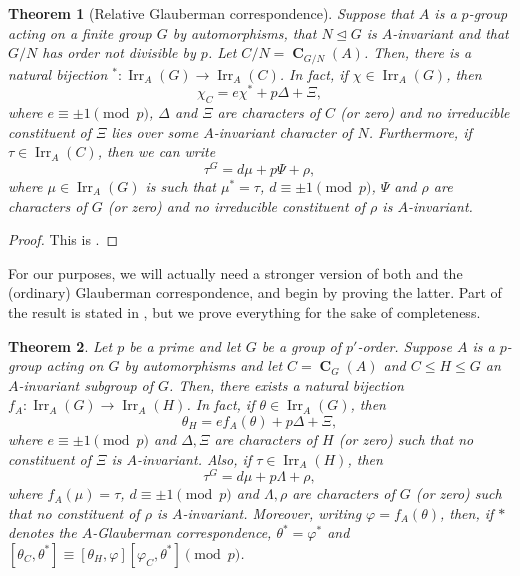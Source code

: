 \documentclass[12pt]{amsart}
\DeclareMathOperator{\CB}{\mathbf{C}}
\DeclareMathOperator{\Irr}{Irr}
\theoremstyle{remark}
\theoremstyle{definition}
\theoremstyle{plain}
\newtheorem{thm}{Theorem}[section]
\theoremstyle{definition}
\numberwithin{equation}{section}
\begin{document}
\begin{thm}[Relative Glauberman correspondence]
	\label{RelativeGlauberman}
	Suppose that $A$ is a $p$-group acting on a finite group $G$ by automorphisms, that $N \unlhd G$ is $A$-invariant and that $G/N$ has order not divisible by $p$. Let $C/N = \CB_{G/N}(A)$. Then, there is a natural bijection $^*: \Irr_A(G) \to \Irr_A(C)$. In fact, if $\chi \in \Irr_A(G)$, then
	\begin{equation*}
		\chi_C = e\chi^* + p\Delta + \Xi,
	\end{equation*}
	where $e \equiv \pm 1 \pmod{p}$, $\Delta$ and $\Xi$ are characters of $C$ (or zero) and no irreducible constituent of $\Xi$ lies over some $A$-invariant character of $N$. Furthermore, if $\tau \in \Irr_A(C)$, then we can write
	\begin{equation*}
		\tau^G = d \mu + p\Psi + \rho,
	\end{equation*}
	where $\mu \in \Irr_A(G)$ is such that $\mu^* = \tau$, $d \equiv \pm 1 \pmod{p}$, $\Psi$ and $\rho$ are characters of $G$ (or zero) and no irreducible constituent of $\rho$ is $A$-invariant.
\end{thm}

\begin{proof}
	This is \cite[Theorem 2.2]{PickyPSolvable}.
\end{proof}

For our purposes, we will actually need a stronger version of both  and the (ordinary) Glauberman correspondence, and begin by proving the latter. Part of the result is stated in \cite[Problem 2.7]{CTMcKC}, but we prove everything for the sake of completeness.

\begin{thm}
	\label{correspondence}
	Let $p$ be a prime and let $G$ be a group of $p'$-order. Suppose $A$ is a $p$-group acting on $G$ by automorphisms and let $C = \CB_G(A)$ and $C \leq H \leq G$ an $A$-invariant subgroup of $G$. Then, there exists a natural bijection $f_A: \Irr_{A}(G) \to \Irr_{A}(H)$. In fact, if $\theta \in \Irr_{A}(G)$, then
	\begin{equation*}
		\theta_H = ef_A(\theta) + p\Delta + \Xi,
	\end{equation*}
	where $e \equiv \pm 1 \pmod{p}$ and $\Delta, \Xi$ are characters of $H$ (or zero) such that no constituent of $\Xi$ is $A$-invariant. Also, if $\tau \in \Irr_{A}(H)$, then 
	\begin{equation*}
		\tau^G = d\mu + p\Lambda + \rho,
	\end{equation*}
	where $f_A(\mu) = \tau$, $d \equiv \pm 1 \pmod{p}$ and $\Lambda, \rho$ are characters of $G$ (or zero) such that no constituent of $\rho$ is $A$-invariant. Moreover, writing $\varphi = f_A(\theta)$, then, if $*$ denotes the $A$-Glauberman correspondence, $\theta^* = \varphi^*$ and $[\theta_C, \theta^*] \equiv [\theta_H, \varphi][\varphi_C, \theta^*] \pmod{p}$.
\end{thm}
\end{document}
